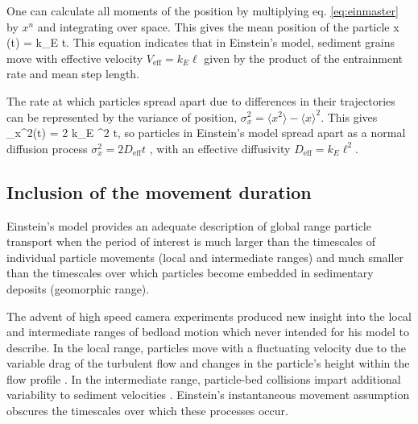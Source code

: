 One can calculate all moments of the position by multiplying eq. \ref{eq:einmaster} by $x^n$ and integrating over space. This gives the mean position of the particle
\be \langle x (t)  \rangle = k_E \ell t. \ee
This equation indicates that in Einstein's model, sediment grains move with effective velocity $V_\text{eff} = k_E \ell$ given by the product of the entrainment rate and mean step length.

The rate at which particles spread apart due to differences in their trajectories can be represented by the variance of position, $\sigma_x^2  = \langle x^2 \rangle - \langle x \rangle^2$. This gives
\be \sigma_x^2(t) = 2 k_E \ell^2 t, \ee
so particles in Einstein's model spread apart as a normal diffusion process $\sigma_x^2 = 2 D_\text{eff} t$ \citep{Sokolov2012}, with an effective diffusivity $D_\text{eff} = k_E \ell^2.$

\subsection{Inclusion of the movement duration}
\label{sec:lisle}

Einstein's model provides an adequate description of global range particle transport when the period of interest is much larger than the timescales of individual particle movements (local and intermediate ranges) and much smaller than the timescales over which particles become embedded in sedimentary deposits (geomorphic range).

The advent of high speed camera experiments produced new insight into the local and intermediate ranges of bedload motion \citep{Abbott1977,Francis1973,Drake1988} which \citet{Einstein1937} never intended for his model to describe.
In the local range, particles move with a fluctuating velocity due to the variable drag of the turbulent flow \citep{Lajeunesse2010,Fathel2015} and changes in the particle's height within the flow profile \citep{VanRijn1984,Wiberg1985}.
In the intermediate range, particle-bed collisions impart additional variability to sediment velocities \citep{Gordon1972,Martin2013}.
Einstein's instantaneous movement assumption obscures the timescales over which these processes occur.

